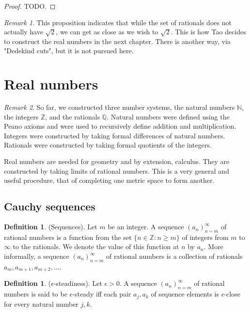 \documentclass[12pt]{article}
\theoremstyle{definition}
\newtheorem{definition}[theorem]{Definition}
\theoremstyle{remark}
\newtheorem*{remark}{Remark}
\begin{document}
\begin{proof}
    TODO.
\end{proof}

\begin{remark}
    This proposition indicates that while the set of rationals does not actually have $\sqrt{2}$, we can get as close as we wish to $\sqrt{2}$. This is how Tao decides to construct the real numbers in the next chapter. There is another way, via "Dedekind cuts", but it is not pursued here.
\end{remark}

\section{Real numbers}

\begin{remark}
    So far, we constructed three number systems, the natural numbers $\mathbb{N}$, the integers $\mathbb{Z}$, and the rationals $\mathbb{Q}$. Natural numbers were defined using the Peano axioms and were used to recursively define addition and multiplication. Integers were constructed by taking formal differences of natural numbers. Rationals were constructed by taking formal quotients of the integers.
    
    Real numbers are needed for geometry and by extension, calculus. They are constructed by taking limits of rational numbers. This is a very general and useful procedure, that of completing one metric space to form another.
\end{remark}

\subsection{Cauchy sequences}

\begin{definition}
    (Sequences). Let $m$ be an integer. A sequence $(a_n)_{n=m}^\infty$ of rational numbers is a function from the set $\{n \in \mathbb{Z} \colon n \geq m\}$ of integers from $m$ to $\infty$ to the rationals. We denote the value of this function at $n$ by $a_n$. More informally, a sequence $(a_n)_{n=m}^\infty$ of rational numbers is a collection of rationals $a_m, a_{m+1}, a_{m+2}, \ldots$.
\end{definition}

\begin{definition}
    ($\epsilon$-steadiness). Let $\epsilon > 0$. A sequence $(a_n)_{n=m}^\infty$ of rational numbers is said to be $\epsilon$-steady iff each pair $a_j, a_k$ of sequence elements is $\epsilon$-close for every natural number $j, k$.
\end{definition}
\end{document}
